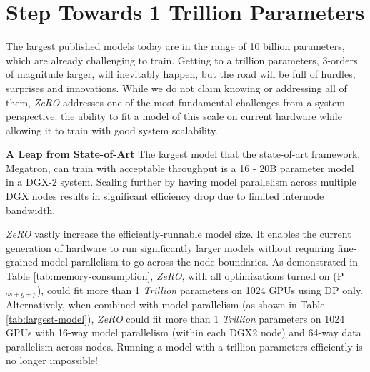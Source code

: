 \documentclass{article}
\newcommand{\name}{\emph{ZeRO}\xspace}
\begin{document}

\section{Step Towards 1 Trillion Parameters}
The largest published models today are in the range of 10 billion parameters, which are already challenging to train.  Getting to a trillion parameters,  3-orders of magnitude larger, will inevitably happen, but the road will be full of hurdles, surprises and innovations. While we do not claim knowing or addressing all of them, \name addresses one of the most fundamental challenges from a system perspective: the ability to fit a model of this scale on current hardware while allowing it to train with good system scalability.

\textbf{A Leap from State-of-Art}  
The largest model that the state-of-art framework, Megatron, can train with acceptable throughput is a 16 - 20B parameter model in a DGX-2 system. Scaling further by having model parallelism across multiple DGX nodes results in significant efficiency drop due to limited internode bandwidth.  

\name vastly increase the efficiently-runnable model size.  It enables the current generation of hardware to run significantly larger models without requiring fine-grained model parallelism to go across the node boundaries.
As demonstrated in Table \ref{tab:memory-consumption}, \name, with all optimizations turned on (P$_{os+g+p}$), could fit more than 1 \emph{Trillion} parameters on 1024 GPUs using DP only.  Alternatively, when combined with model parallelism (as shown in Table \ref{tab:largest-model}), \name could fit more than 1 \emph{Trillion} parameters on 1024 GPUs with 16-way model parallelism (within each DGX2 node) and 64-way data parallelism across nodes.  Running a model with a trillion parameters efficiently is no longer impossible!
\end{document}

